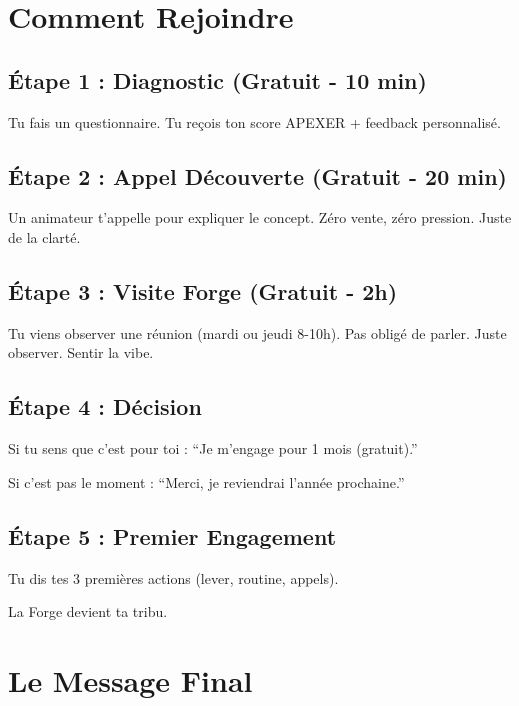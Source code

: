 \documentclass[12pt,a4paper,openany]{book}
\begin{document}
\clearpage

\chapter*{Comment Rejoindre}

\section*{Étape 1 : Diagnostic (Gratuit - 10 min)}

Tu fais un questionnaire. Tu reçois ton score APEXER + feedback personnalisé.

\section*{Étape 2 : Appel Découverte (Gratuit - 20 min)}

Un animateur t'appelle pour expliquer le concept. Zéro vente, zéro pression. Juste de la clarté.

\section*{Étape 3 : Visite Forge (Gratuit - 2h)}

Tu viens observer une réunion (mardi ou jeudi 8-10h). Pas obligé de parler. Juste observer. Sentir la vibe.

\section*{Étape 4 : Décision}

Si tu sens que c'est pour toi : ``Je m'engage pour 1 mois (gratuit).''

Si c'est pas le moment : ``Merci, je reviendrai l'année prochaine.''

\section*{Étape 5 : Premier Engagement}

Tu dis tes 3 premières actions (lever, routine, appels).

La Forge devient ta tribu.

\clearpage

\chapter*{Le Message Final}
\end{document}
